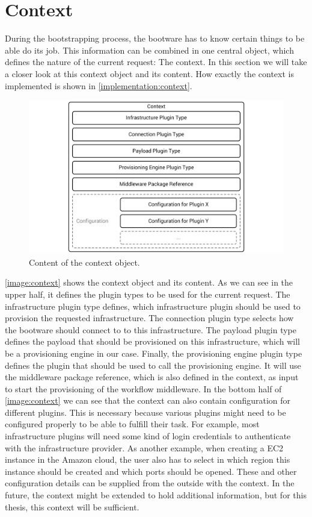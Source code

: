 \section{Context}
\label{design:context}

During the bootstrapping process, the bootware has to know certain things to be able do its job.
This information can be combined in one central object, which defines the nature of the current request: The context.
In this section we will take a closer look at this context object and its content.
How exactly the context is implemented is shown in \autoref{implementation:context}.

\begin{figure}[!htbp]
	\centering
	\includegraphics[resolution=600]{design/assets/context}
	\caption{Content of the context object.}
	\label{image:context}
\end{figure}

\autoref{image:context} shows the context object and its content.
As we can see in the upper half, it defines the plugin types to be used for the current request.
The infrastructure plugin type defines, which infrastructure plugin should be used to provision the requested infrastructure.
The connection plugin type selects how the bootware should connect to to this infrastructure.
The payload plugin type defines the payload that should be provisioned on this infrastructure, which will be a provisioning engine in our case.
Finally, the provisioning engine plugin type defines the plugin that should be used to call the provisioning engine.
It will use the middleware package reference, which is also defined in the context, as input to start the provisioning of the workflow middleware.
In the bottom half of \autoref{image:context} we can see that the context can also contain configuration for different plugins.
This is necessary because various plugins might need to be configured properly to be able to fulfill their task.
For example, most infrastructure plugins will need some kind of login credentials to authenticate with the infrastructure provider.
As another example, when creating a EC2 instance in the Amazon cloud, the user also has to select in which region this instance should be created and which ports should be opened.
These and other configuration details can be supplied from the outside with the context.
In the future, the context might be extended to hold additional information, but for this thesis, this context will be sufficient.

